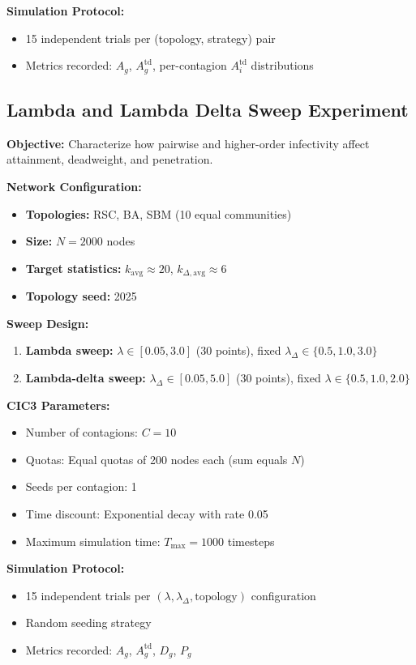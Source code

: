 \documentclass[sigconf]{acmart}
\begin{document}
\textbf{Simulation Protocol:}
\begin{itemize}
    \item 15 independent trials per (topology, strategy) pair
    \item Metrics recorded: $A_g$, $A_g^{\text{td}}$, per-contagion $A_i^{\text{td}}$ distributions
\end{itemize}

\subsection{Lambda and Lambda Delta Sweep Experiment}
\label{app:lambda}

\textbf{Objective:} Characterize how pairwise and higher-order infectivity affect attainment, deadweight, and penetration.

\textbf{Network Configuration:}
\begin{itemize}
    \item \textbf{Topologies:} RSC, BA, SBM (10 equal communities)
    \item \textbf{Size:} $N=2000$ nodes
    \item \textbf{Target statistics:} $k_{\text{avg}} \approx 20$, $k_{\Delta,\text{avg}} \approx 6$
    \item \textbf{Topology seed:} 2025
\end{itemize}

\textbf{Sweep Design:}
\begin{enumerate}
    \item \textbf{Lambda sweep:} $\lambda \in [0.05, 3.0]$ (30 points), fixed $\lambda_{\Delta} \in \{0.5, 1.0, 3.0\}$
    \item \textbf{Lambda-delta sweep:} $\lambda_{\Delta} \in [0.05, 5.0]$ (30 points), fixed $\lambda \in \{0.5, 1.0, 2.0\}$
\end{enumerate}

\textbf{CIC3 Parameters:}
\begin{itemize}
    \item Number of contagions: $C=10$
    \item Quotas: Equal quotas of 200 nodes each (sum equals $N$)
    \item Seeds per contagion: 1
    \item Time discount: Exponential decay with rate 0.05
    \item Maximum simulation time: $T_{\text{max}} = 1000$ timesteps
\end{itemize}

\textbf{Simulation Protocol:}
\begin{itemize}
    \item 15 independent trials per $(\lambda, \lambda_{\Delta}, \text{topology})$ configuration
    \item Random seeding strategy
    \item Metrics recorded: $A_g$, $A_g^{\text{td}}$, $D_g$, $P_g$
\end{itemize}
\end{document}
